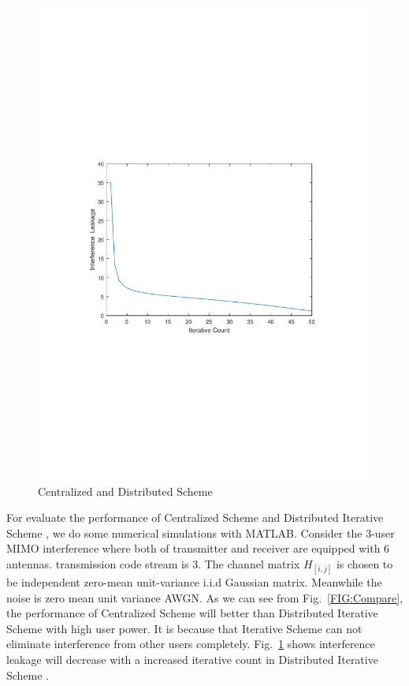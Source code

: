 \documentclass[12pt, onecolumn]{IEEEtran}
\begin{document}
\begin{figure}[H]
    \centering\includegraphics[width=0.65\columnwidth]{IterativeCount.pdf}
    \caption{ Centralized and Distributed Scheme}\label{FIG:IterativeCount}
\end{figure}
For evaluate the performance  of Centralized Scheme \cite{cadambe2008interference} and Distributed Iterative Scheme \cite{gomadam2011distributed}, we do some numerical  simulations with MATLAB. Consider the $3$-user MIMO interference where both of transmitter and receiver are equipped with 6 antennas.  transmission code stream is 3.  The channel matrix $H_{[i,j]}$ is chosen to be independent zero-mean unit-variance i.i.d Gaussian matrix. Meanwhile the noise is  zero mean unit variance  AWGN.   As we can see from Fig.~\ref{FIG:Compare}, the performance of Centralized Scheme will better than  Distributed Iterative Scheme with high user power. It is because that  Iterative Scheme can not eliminate interference from other users completely.   Fig.~\ref{FIG:IterativeCount} shows interference leakage will decrease with a increased iterative count in  Distributed Iterative Scheme .
\end{document}
